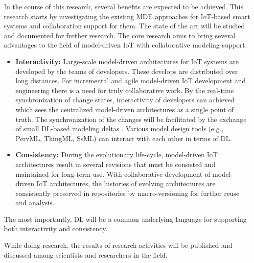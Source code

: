 In the course of this research, several benefits are expected to be achieved. This research starts by investigating the existing MDE approaches for IoT-based smart systems and collaboration support for them. The state of the art will be studied and documented for further research. The core research aims to bring several advantages to the field of model-driven IoT with collaborative modeling support.
\begin{itemize}
\item \textbf{Interactivity:} Large-scale model-driven architectures for IoT systems are developed by the teams of developers. These develops are distributed over long distances. For incremental and agile model-driven IoT development and engineering there is a need for truly collaborative work. By the real-time synchronization of change states, interactivity of developers can achieved which sees the centralized model-driven architectures as a single point of truth. The synchronization of the changes will be facilitated by the exchange of small DL-based modeling deltas \cite{Kuryazov+2018}. Various model design tools (e.g., PervML, ThingML, SsML) can interact with each other in terms of DL.
\item \textbf{Consistency:} During the evolutionary life-cycle, model-driven IoT architectures result in several revisions that must be consisted and maintained for long-term use. With collaborative development of model-driven IoT architectures, the histories of evolving architectures are consistently preserved in repositories by macro-versioning for further reuse and analysis.
\end{itemize}

The most importantly, DL will be a common underlying language for supporting both interactivity and consistency.

While doing research, the results of research activities will be published and discussed among scientists and researchers in the field.